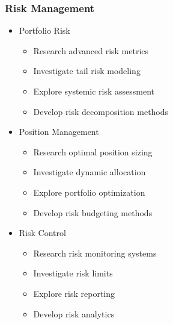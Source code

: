 \documentclass[conference]{IEEEtran}
\begin{document}
\subsubsection{Risk Management}
\begin{itemize}
    \item Portfolio Risk
    \begin{itemize}
        \item Research advanced risk metrics
        \item Investigate tail risk modeling
        \item Explore systemic risk assessment
        \item Develop risk decomposition methods
    \end{itemize}
    
    \item Position Management
    \begin{itemize}
        \item Research optimal position sizing
        \item Investigate dynamic allocation
        \item Explore portfolio optimization
        \item Develop risk budgeting methods
    \end{itemize}
    
    \item Risk Control
    \begin{itemize}
        \item Research risk monitoring systems
        \item Investigate risk limits
        \item Explore risk reporting
        \item Develop risk analytics
    \end{itemize}
\end{itemize}
\end{document}
